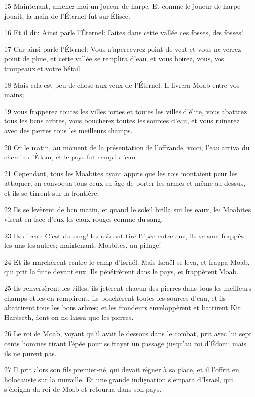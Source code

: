 \par 15 Maintenant, amenez-moi un joueur de harpe. Et comme le joueur de harpe jouait, la main de l'Éternel fut sur Élisée.
\par 16 Et il dit: Ainsi parle l'Éternel: Faites dans cette vallée des fosses, des fosses!
\par 17 Car ainsi parle l'Éternel: Vous n'apercevrez point de vent et vous ne verrez point de pluie, et cette vallée se remplira d'eau, et vous boirez, vous, vos troupeaux et votre bétail.
\par 18 Mais cela est peu de chose aux yeux de l'Éternel. Il livrera Moab entre vos mains;
\par 19 vous frapperez toutes les villes fortes et toutes les villes d'élite, vous abattrez tous les bons arbres, vous boucherez toutes les sources d'eau, et vous ruinerez avec des pierres tous les meilleurs champs.
\par 20 Or le matin, au moment de la présentation de l'offrande, voici, l'eau arriva du chemin d'Édom, et le pays fut rempli d'eau.
\par 21 Cependant, tous les Moabites ayant appris que les rois montaient pour les attaquer, on convoqua tous ceux en âge de porter les armes et même au-dessus, et ils se tinrent sur la frontière.
\par 22 Ils se levèrent de bon matin, et quand le soleil brilla sur les eaux, les Moabites virent en face d'eux les eaux rouges comme du sang.
\par 23 Ils dirent: C'est du sang! les rois ont tiré l'épée entre eux, ils se sont frappés les uns les autres; maintenant, Moabites, au pillage!
\par 24 Et ils marchèrent contre le camp d'Israël. Mais Israël se leva, et frappa Moab, qui prit la fuite devant eux. Ils pénétrèrent dans le pays, et frappèrent Moab.
\par 25 Ils renversèrent les villes, ils jetèrent chacun des pierres dans tous les meilleurs champs et les en remplirent, ils bouchèrent toutes les sources d'eau, et ils abattirent tous les bons arbres; et les frondeurs enveloppèrent et battirent Kir Haréseth, dont on ne laissa que les pierres.
\par 26 Le roi de Moab, voyant qu'il avait le dessous dans le combat, prit avec lui sept cents hommes tirant l'épée pour se frayer un passage jusqu'au roi d'Édom; mais ils ne purent pas.
\par 27 Il prit alors son fils premier-né, qui devait régner à sa place, et il l'offrit en holocauste sur la muraille. Et une grande indignation s'empara d'Israël, qui s'éloigna du roi de Moab et retourna dans son pays.

